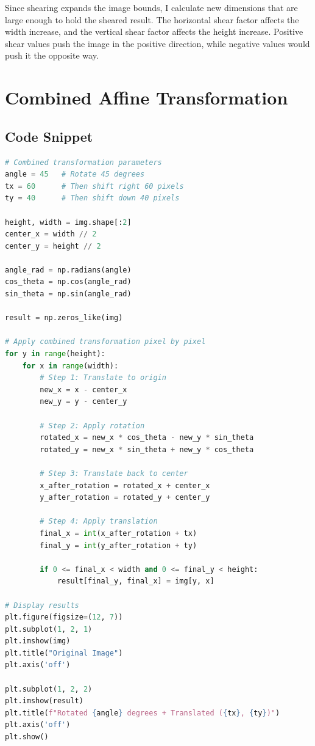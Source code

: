 \documentclass[12pt,a4paper]{report}
\begin{document}
Since shearing expands the image bounds, I calculate new dimensions that are large enough to hold the sheared result. The horizontal shear factor affects the width increase, and the vertical shear factor affects the height increase. Positive shear values push the image in the positive direction, while negative values would push it the opposite way.

\section{Combined Affine Transformation}

\subsection{Code Snippet}
\begin{lstlisting}[language=Python, caption={Rotation Followed by Translation}]
# Combined transformation parameters
angle = 45   # Rotate 45 degrees
tx = 60      # Then shift right 60 pixels
ty = 40      # Then shift down 40 pixels

height, width = img.shape[:2]
center_x = width // 2
center_y = height // 2

angle_rad = np.radians(angle)
cos_theta = np.cos(angle_rad)
sin_theta = np.sin(angle_rad)

result = np.zeros_like(img)

# Apply combined transformation pixel by pixel
for y in range(height):
    for x in range(width):
        # Step 1: Translate to origin
        new_x = x - center_x
        new_y = y - center_y
        
        # Step 2: Apply rotation
        rotated_x = new_x * cos_theta - new_y * sin_theta
        rotated_y = new_x * sin_theta + new_y * cos_theta
        
        # Step 3: Translate back to center
        x_after_rotation = rotated_x + center_x
        y_after_rotation = rotated_y + center_y
        
        # Step 4: Apply translation
        final_x = int(x_after_rotation + tx)
        final_y = int(y_after_rotation + ty)
        
        if 0 <= final_x < width and 0 <= final_y < height:
            result[final_y, final_x] = img[y, x]

# Display results
plt.figure(figsize=(12, 7))
plt.subplot(1, 2, 1)
plt.imshow(img)
plt.title("Original Image")
plt.axis('off')

plt.subplot(1, 2, 2)
plt.imshow(result)
plt.title(f"Rotated {angle} degrees + Translated ({tx}, {ty})")
plt.axis('off')
plt.show()
\end{lstlisting}
\end{document}
